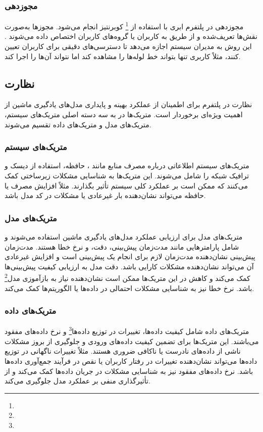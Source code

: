 \subsubsection{مجوزدهی}
مجوزدهی در پلتفرم ابری با استفاده از \footnote{} کوبرنتیز انجام می‌شود. مجوزها به‌صورت نقش‌ها تعریف‌شده و از طریق  به کاربران یا گروه‌های کاربران اختصاص داده می‌شوند \cite{Kubernetes1}. این روش به مدیران سیستم اجازه می‌دهد تا دسترسی‌های دقیقی برای کاربران تعیین کنند، مثلاً کاربری تنها بتواند خط لوله‌ها را مشاهده کند اما نتواند آن‌ها را اجرا کند.

\subsection{نظارت}
نظارت در پلتفرم  برای اطمینان از عملکرد بهینه و پایداری مدل‌های یادگیری ماشین از اهمیت ویژه‌ای برخوردار است. متریک‌ها در  به سه دسته اصلی متریک‌های سیستم، متریک‌های مدل و متریک‌های داده تقسیم می‌شوند.

\subsubsection{متریک‌های سیستم}
متریک‌های سیستم اطلاعاتی درباره مصرف منابع مانند ، حافظه، استفاده از دیسک و ترافیک شبکه را شامل می‌شوند. این متریک‌ها به شناسایی مشکلات زیرساختی کمک می‌کنند که ممکن است بر عملکرد کلی سیستم تأثیر بگذارند. مثلاً افزایش مصرف  یا حافظه می‌تواند نشان‌دهنده بار غیرعادی یا مشکلات در کد مدل باشد.

\subsubsection{متریک‌های مدل}
متریک‌های مدل برای ارزیابی عملکرد مدل‌های یادگیری ماشین استفاده می‌شوند و شامل پارامترهایی مانند مدت‌زمان پیش‌بینی، دقت،  و نرخ خطا هستند. مدت‌زمان پیش‌بینی نشان‌دهنده مدت‌زمان لازم برای انجام یک پیش‌بینی است و افزایش غیرعادی آن می‌تواند نشان‌دهنده مشکلات کارایی باشد. دقت مدل به ارزیابی کیفیت پیش‌بینی‌ها کمک می‌کند و کاهش در این متریک‌ها ممکن است نشان‌دهنده نیاز به بازآموزی مدل\footnote{} باشد. نرخ خطا نیز به شناسایی مشکلات احتمالی در داده‌ها یا الگوریتم‌ها کمک می‌کند.

\subsubsection{متریک‌های داده}
متریک‌های داده شامل کیفیت داده‌ها، تغییرات در توزیع داده‌ها\footnote{} و نرخ داده‌های مفقود می‌باشند. این متریک‌ها برای تضمین کیفیت داده‌های ورودی و جلوگیری از بروز مشکلات ناشی از داده‌های نادرست یا ناکافی ضروری هستند. مثلاً تغییرات ناگهانی در توزیع داده‌ها می‌تواند نشان‌دهنده تغییرات در رفتار کاربران یا نقص در فرآیند جمع‌آوری داده‌ها باشد. نرخ داده‌های مفقود نیز به شناسایی مشکلات در جریان داده‌ها کمک می‌کند و از تأثیرگذاری منفی بر عملکرد مدل جلوگیری می‌کند.

